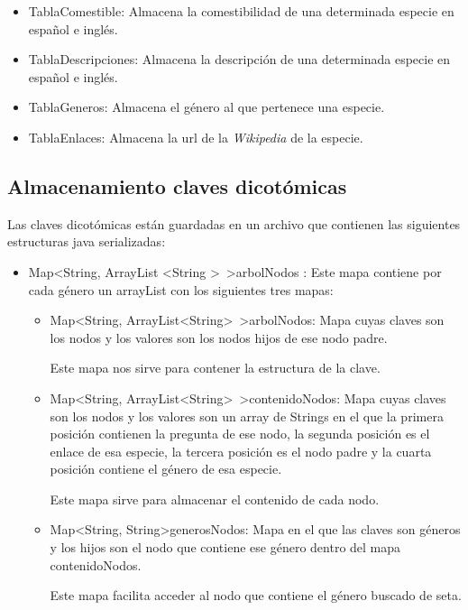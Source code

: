\begin{itemize}
	\item TablaComestible: Almacena la comestibilidad de una determinada especie en español e inglés.
	\item TablaDescripciones: Almacena la descripción de una determinada especie en español e inglés.
	\item TablaGeneros: Almacena el género al que pertenece una especie.
	\item TablaEnlaces: Almacena la url de la \textit{Wikipedia} de la especie. 
\end{itemize}

\subsection{Almacenamiento claves dicotómicas}

Las claves dicotómicas están guardadas en un archivo que contienen las siguientes estructuras java serializadas:

\begin{itemize}
	\item Map\textless String, ArrayList \textless String \textgreater \ \textgreater      arbolNodos : Este mapa contiene por cada género un arrayList con los siguientes tres mapas:
	\begin{itemize}
		\item Map\textless String, ArrayList\textless String\textgreater \ \textgreater arbolNodos: Mapa cuyas claves son los nodos y los valores son los nodos hijos de ese nodo padre. 
		
Este mapa nos sirve para contener la estructura de la clave.
		\item Map\textless String, ArrayList\textless String\textgreater \ \textgreater contenidoNodos: Mapa cuyas claves son los nodos y los valores son un array de Strings en el que la primera posición contienen la pregunta de ese nodo, la segunda posición es el enlace de esa especie, la tercera posición es el nodo padre y la cuarta posición contiene el género de esa especie.
		
Este mapa sirve para almacenar el contenido de cada nodo.
		\item Map\textless String, String\textgreater generosNodos: Mapa en el que las claves son géneros y los hijos son el nodo que contiene ese género dentro del mapa contenidoNodos.
		
Este mapa facilita acceder al nodo que contiene el género buscado de seta.
	\end{itemize}
\end{itemize}

